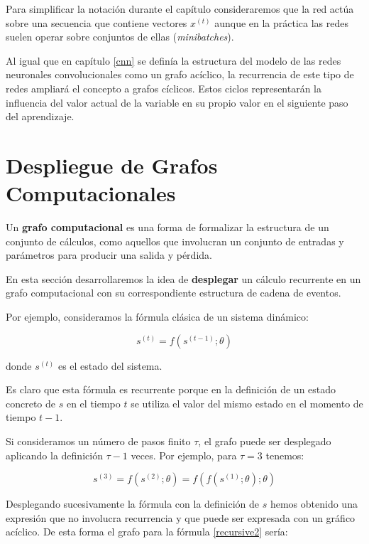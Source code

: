 Para simplificar la notación durante el capítulo consideraremos que la red actúa sobre una secuencia que contiene vectores $x^{(t)}$ aunque en la práctica las redes suelen operar sobre conjuntos de ellas (\textit{minibatches}).

Al igual que en capítulo \ref{cnn} se definía la estructura del modelo de las redes neuronales convolucionales como un grafo acíclico, la recurrencia de este tipo de redes ampliará el concepto a grafos cíclicos. Estos ciclos representarán la influencia del valor actual de la variable en su propio valor en el siguiente paso del aprendizaje. 

\section{Despliegue de Grafos Computacionales}

	Un \textbf{grafo computacional } es una forma de formalizar la estructura de un conjunto de cálculos, como aquellos que involucran un conjunto de entradas y parámetros para producir una salida y pérdida.
	
	En esta sección desarrollaremos la idea de \textbf{desplegar} un cálculo recurrente en un grafo computacional con su correspondiente estructura de cadena de eventos. 
	
	Por ejemplo, consideramos la fórmula clásica de un sistema dinámico:
	
	\begin{equation}\label{recursive}
		s^{(t)} = f(s^{(t-1)}; \theta)
	\end{equation}
		
	
	donde $s^{(t)}$ es el estado del sistema.
	
	Es claro que esta fórmula es recurrente porque en la definición de un estado concreto de $s$ en el tiempo $t$ se utiliza el valor del mismo estado en el momento de tiempo $t-1$.
	
	Si consideramos un número de pasos finito $\tau$, el grafo puede ser desplegado aplicando la definición $\tau -1 $ veces.  Por ejemplo, para $\tau = 3$ tenemos:
	
	\begin{equation}\label{recursive2}
		s^{(3)} = f(s^{(2)}; \theta) = f(f(s^{(1)}; \theta); \theta)
	\end{equation}
		
	
	Desplegando sucesivamente la fórmula con la definición de $s$ hemos obtenido una expresión que no involucra recurrencia y que puede ser expresada con un gráfico acíclico. De esta forma el grafo para la fórmula \ref{recursive2} sería:
	
